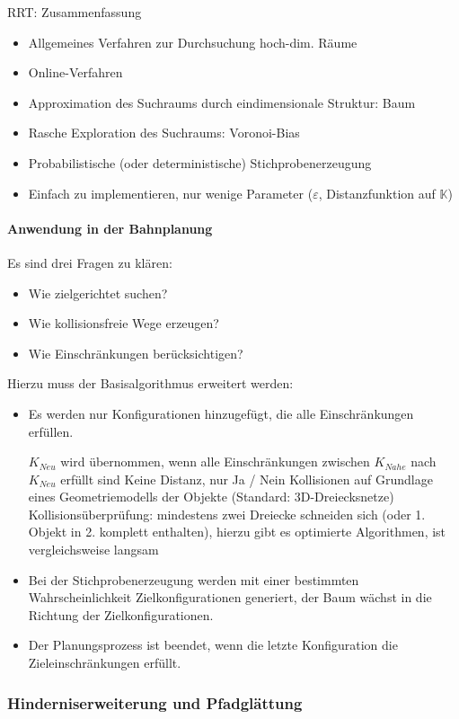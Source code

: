RRT: Zusammenfassung
\begin{itemize}
\item Allgemeines Verfahren zur Durchsuchung hoch-dim. Räume
\item Online-Verfahren
\item Approximation des Suchraums durch eindimensionale Struktur: Baum
\item Rasche Exploration des Suchraums: Voronoi-Bias
\item Probabilistische (oder deterministische) Stichprobenerzeugung
\item Einfach zu implementieren, nur wenige Parameter ($\varepsilon$, Distanzfunktion auf $\mathbb{K}$)
\end{itemize}
\paragraph{Anwendung in der Bahnplanung} Es sind drei Fragen zu klären:
\begin{itemize}
\item Wie zielgerichtet suchen?
\item Wie kollisionsfreie Wege erzeugen?
\item Wie Einschränkungen berücksichtigen?
\end{itemize}
Hierzu muss der Basisalgorithmus erweitert werden:
\begin{itemize}
\item Es werden nur Konfigurationen hinzugefügt, die alle Einschränkungen erfüllen.
\begin{itemize}
\ita $K_{Neu}$ wird übernommen, wenn alle Einschränkungen zwischen $K_{Nahe}$ nach $K_{Neu}$ erfüllt sind
\ita Keine Distanz, nur Ja / Nein
\ita Kollisionen auf Grundlage eines Geometriemodells der Objekte (Standard: 3D-Dreiecksnetze)
\ita Kollisionsüberprüfung: mindestens zwei Dreiecke schneiden sich (oder 1. Objekt in 2. komplett enthalten), hierzu gibt es optimierte Algorithmen, ist vergleichsweise langsam
\end{itemize}
\item Bei der Stichprobenerzeugung werden mit einer bestimmten Wahrscheinlichkeit Zielkonfigurationen generiert, der Baum wächst in die Richtung der Zielkonfigurationen.
\item Der Planungsprozess ist beendet, wenn die letzte Konfiguration die Zieleinschränkungen erfüllt.
\end{itemize} 
\subsubsection*{Hinderniserweiterung und Pfadglättung}
